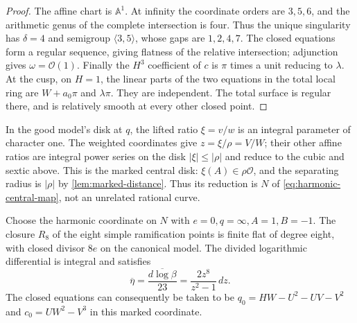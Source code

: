 \begin{proof}
The affine chart is $\mathbb A^1$.  At infinity the coordinate orders
are $3,5,6$, and the arithmetic genus of the complete intersection is
four.  Thus the unique singularity has $\delta=4$ and semigroup
$\langle3,5\rangle$, whose gaps are $1,2,4,7$.
The closed equations form a regular sequence, giving flatness of
the relative intersection; adjunction gives $\omega=\mathcal O(1)$.
Finally the $H^3$ coefficient of $c$ is $\pi$ times a unit reducing
to $\lambda$.  At the cusp, on $H=1$, the linear parts of the two
equations in the total local ring are $W+a_0\pi$ and $\lambda\pi$.
They are independent.  The total surface is regular there, and is
relatively smooth at every other closed point.
\end{proof}

In the good model's disk at $q$, the lifted ratio $\xi=v/w$ is an
integral parameter of character one.  The weighted coordinates give
$z=\xi/\rho=V/W$; their other affine ratios are integral power
series on the disk $|\xi|\le|\rho|$ and reduce to the cubic and sextic
above.  This is the marked central disk: $\xi(A)\in\rho\mathcal O$,
and the separating radius is $|\rho|$ by
\cref{lem:marked-distance}.  Thus its reduction is $N$ of
\cref{eq:harmonic-central-map}, not an unrelated rational curve.

\begin{proposition}
\label{prop:harmonic-effective-differential}
Choose the harmonic coordinate on $N$ with $e=0,q=\infty,A=1,B=-1$.
The closure $R_8$ of the eight simple ramification points is finite
flat of degree eight, with closed divisor $8e$ on the canonical
model.  The divided logarithmic differential is integral and satisfies
\begin{equation}
 \overline\eta=\overline{\frac{d\log\beta}{23}}
       =\frac{2z^8}{z^2-1}\,dz.
\label{eq:harmonic-effective-differential}
\end{equation}
The closed equations can consequently be taken to be
$q_0=HW-U^2-UV-V^2$ and $c_0=UW^2-V^3$ in this marked coordinate.
\end{proposition}


